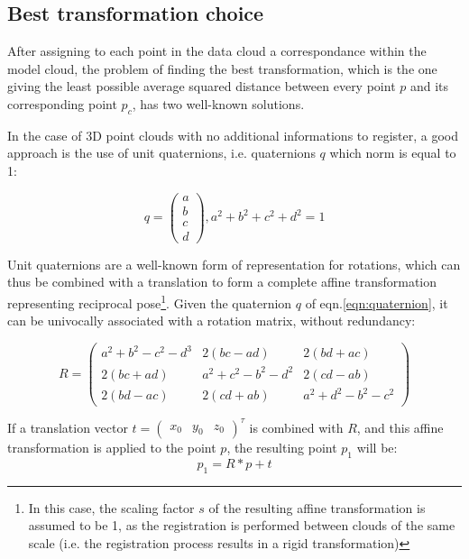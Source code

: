 \subsection{Best transformation choice} \label{sec:icp-best-transformation}
After assigning to each point in the data cloud a correspondance within the
model cloud, the problem of finding the best transformation, which is the one
giving the least possible average squared distance between every point $p$ and
its corresponding point $p_c$, has two well-known solutions. 

In the case of 3D point clouds with no additional informations to register, a
good approach is the use of unit quaternions, i.e. quaternions $q$ which norm is
equal to 1:

\begin{equation} \label{eqn:quaternion}
q = \begin{pmatrix}a\\b\\c\\d\end{pmatrix}, a^2+b^2+c^2+d^2=1
\end{equation}

Unit quaternions are a well-known form of representation for rotations, which can
thus be combined with a translation to form a complete affine transformation
representing reciprocal pose\footnote{In this case, the scaling factor $s$ of
  the resulting affine transformation is assumed to be 1, as the registration is
  performed between clouds of the same scale (i.e. the registration process
results in a rigid transformation)}. Given the quaternion $q$ of
eqn.\ref{eqn:quaternion}, it can be univocally associated with a rotation
matrix, without redundancy:

\begin{equation}
  R = \begin{pmatrix}
    a^2+b^2-c^2-d^3 & 2\left(b c - a d \right) & 2\left( b d + a c \right) \\
    2\left(b c + a d \right) & a^2+c^2-b^2-d^2 & 2\left( c d - a b \right) \\
    2\left( b d - a c \right) & 2\left(c d + a b\right) & a^2+d^2-b^2-c^2
  \end{pmatrix}
\end{equation}

If a translation vector $t=\begin{pmatrix}x_0 & y_0 & z_0\end{pmatrix}^{\tau}$
is combined with $R$, and this affine transformation is applied to the point
$p$, the resulting point $p_1$ will be:
\begin{equation}
  p_1=R*p+t
\end{equation}

